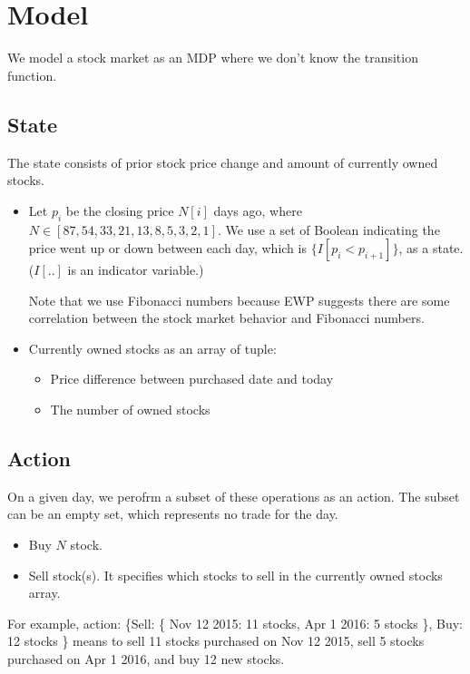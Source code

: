 \documentclass[12pt]{article}
\begin{document}
\section{Model}

We model a stock market as an MDP where we don't know the
transition function.

\subsection{State}

The state consists of prior stock price change and amount of currently owned stocks. 

\begin{itemize}
\item Let $p_i$ be the closing price $N[i]$ days ago, where $N \in [87,54,33,21,13,8,5,3,2,1]$.
  We use a set of Boolean indicating the price went up or down between each day, which is $\{I[p_i < p_{i+1}]\}$, as a
  state. ($I[..]$ is an indicator variable.)

  Note that we use Fibonacci numbers because EWP suggests there are
  some correlation between the stock market behavior and Fibonacci
  numbers.
  
\item Currently owned stocks as an array of tuple:
  \begin{itemize}
  \item Price difference between purchased date and today
  \item The number of owned stocks
  \end{itemize}
  
\end{itemize}

\subsection{Action}

On a given day, we perofrm a subset of these operations as an action. The subset can be an empty set, which represents
no trade for the day.

\begin{itemize}
\item Buy $N$ stock.
\item Sell stock(s). It specifies which stocks to sell in the
  currently owned stocks array. 
\end{itemize}

For example, action: \{Sell: \{ Nov 12 2015: 11 stocks, Apr 1 2016: 5 stocks \}, Buy: 12 stocks \} means to sell 11
stocks purchased on Nov 12 2015, sell 5 stocks purchased on Apr 1 2016, and buy 12 new stocks.
\end{document}
